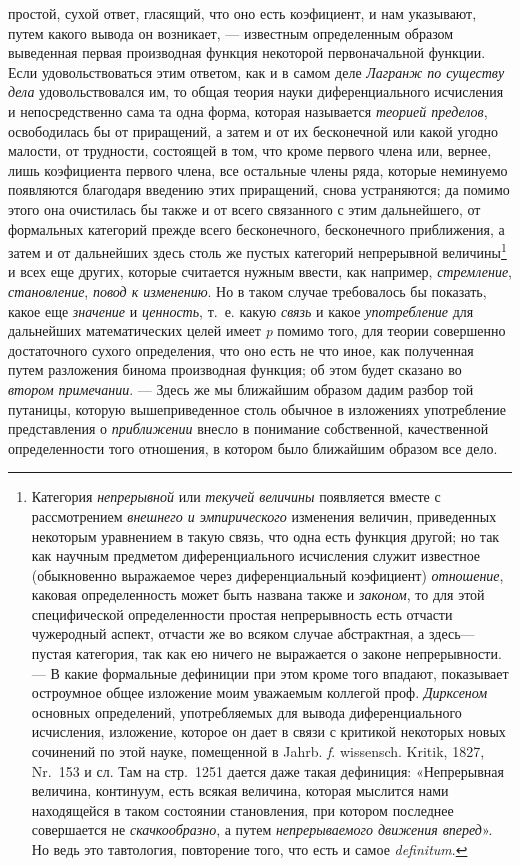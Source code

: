 {простой, сухой ответ, гласящий, что оно есть коэфициент, и нам указывают,
путем какого вывода он возникает, — известным определенным образом
выведенная первая производная функция некоторой первоначальной функции.
Если удовольствоваться этим ответом, как и в самом деле
{\em Лагранж по существу дела} удовольствовался им, то
общая теория науки диференциального исчисления и непосредственно сама та
одна форма, которая называется {\em теорией пределов},
освободилась бы от приращений, а затем и от их бесконечной или какой угодно
малости, от трудности, состоящей в том, что кроме первого члена или,
вернее, лишь коэфициента первого члена, все остальные члены ряда, которые
неминуемо появляются благодаря введению этих приращений, снова устраняются;
да помимо этого она очистилась бы также и от всего связанного с этим
дальнейшего, от формальных категорий прежде всего бесконечного,
бесконечного приближения, а затем и от дальнейших здесь столь же пустых
категорий непрерывной величины\footnote{Категория
{\em непрерывной} или {\em текучей величины} появляется вместе с рассмотрением
{\em внешнего и эмпирического} изменения величин,
приведенных некоторым уравнением в такую
связь, что одна есть функция другой; но так как научным предметом
диференциального исчисления служит известное (обыкновенно выражаемое через
диференциальный коэфициент) {\em отношение}, каковая
определенность может быть названа также и {\em законом}, то для
этой специфической определенности простая непрерывность есть отчасти
чужеродный аспект, отчасти же во всяком случае абстрактная, а здесь— пустая
категория, так как ею ничего не выражается о законе непрерывности. —
В какие формальные дефиниции при этом кроме того впадают,
показывает остроумное общее изложение моим уважаемым коллегой проф.
{\em Дирксеном} основных
определений, употребляемых для вывода диференциального исчисления,
изложение, которое он дает в связи с критикой некоторых новых сочинений по
этой науке, помещенной в Jahrb. {\em f}.
wissensch. Kritik, 1827, Nr.~153 и сл. Там на стр.~1251
дается даже такая дефиниция: «Непрерывная величина, континуум, есть всякая
величина, которая мыслится нами находящейся в таком состоянии становления,
при котором последнее совершается не
{\em скачкообразно}, а путем {\em непрерываемого движения
вперед}». Но ведь это тавтология, повторение того, что есть
и самое {\em definitum}.} и всех еще других, которые
считается нужным ввести, как например,
{\em стремление},
{\em становление}, {\em повод к
изменению}. Но в таком случае требовалось бы показать, какое еще
{\em значение} и
{\em ценность}, т.~е. какую
{\em связь} и какое
{\em употребление} для дальнейших математических целей
имеет {\em p} помимо того, для теории совершенно
достаточного сухого определения, что оно есть не что иное, как полученная
путем разложения бинома производная функция; об этом будет сказано во
{\em втором примечании}. — Здесь же мы ближайшим
образом дадим разбор той путаницы, которую вышеприведенное столь обычное в
изложениях употребление представления о
{\em приближении} внесло в понимание собственной,
качественной определенности того отношения, в котором было ближайшим
образом все дело.

}
